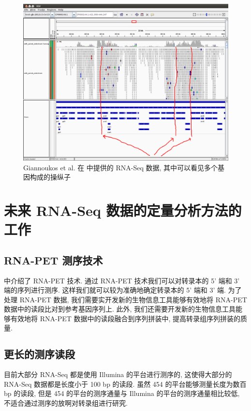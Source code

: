 \begin{figure}[!t]
\centering
\includegraphics[width=\textwidth]{figures/disc/disc-bacteria-operons-1.png}
\caption{Giannoukos et al. 在  中提供的 RNA-Seq 数据, 
其中可以看见多个基因构成的操纵子}
\label{disc-bacteria-operons-1}
\end{figure}

\section{未来 RNA-Seq 数据的定量分析方法的工作}

\subsection{RNA-PET 测序技术} %
 中介绍了 RNA-PET 技术. 
通过 RNA-PET 技术我们可以对转录本的 5' 端和 3' 端的序列进行测序. 
这样我们就可以较为准确地确定转录本的 5' 端和 3' 端. 
为了处理 RNA-PET 数据, 我们需要实开发新的生物信息工具能够有效地将 RNA-PET 
数据中的读段比对到参考基因序列上. 此外, 我们还需要开发新的生物信息工具能够有效地将 RNA-PET 
数据中的读段融合到序列拼装中, 提高转录组序列拼装的质量. 

\subsection{更长的测序读段} %
目前大部分 RNA-Seq 都是使用 Illumina 的平台进行测序的, 
这使得大部分的 RNA-Seq 数据都是长度小于 100 bp 的读段. 
虽然 454 的平台能够测量长度为数百 bp 的读段, 
但是 454 的平台的测序通量与 Illumina 的平台的测序通量相比较低, 
不适合通过测序的放啊对转录组进行研究. 

